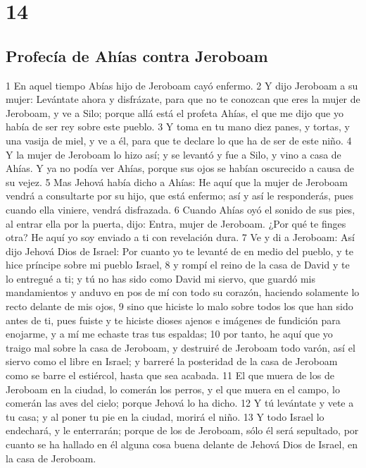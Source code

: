 \chapter{14}

\section*{Profecía de Ahías contra Jeroboam}

1 En aquel tiempo Abías hijo de Jeroboam cayó enfermo.
2 Y dijo Jeroboam a su mujer: Levántate ahora y disfrázate, para que no te conozcan que eres la mujer de Jeroboam, y ve a Silo; porque allá está el profeta Ahías, el que me dijo que yo había de ser rey sobre este pueblo.
3 Y toma en tu mano diez panes, y tortas, y una vasija de miel, y ve a él, para que te declare lo que ha de ser de este niño.
4 Y la mujer de Jeroboam lo hizo así; y se levantó y fue a Silo, y vino a casa de Ahías. Y ya no podía ver Ahías, porque sus ojos se habían oscurecido a causa de su vejez.
5 Mas Jehová había dicho a Ahías: He aquí que la mujer de Jeroboam vendrá a consultarte por su hijo, que está enfermo; así y así le responderás, pues cuando ella viniere, vendrá disfrazada.
6 Cuando Ahías oyó el sonido de sus pies, al entrar ella por la puerta, dijo: Entra, mujer de Jeroboam. ¿Por qué te finges otra? He aquí yo soy enviado a ti con revelación dura.
7 Ve y di a Jeroboam: Así dijo Jehová Dios de Israel: Por cuanto yo te levanté de en medio del pueblo, y te hice príncipe sobre mi pueblo Israel,
8 y rompí el reino de la casa de David y te lo entregué a ti; y tú no has sido como David mi siervo, que guardó mis mandamientos y anduvo en pos de mí con todo su corazón, haciendo solamente lo recto delante de mis ojos,
9 sino que hiciste lo malo sobre todos los que han sido antes de ti, pues fuiste y te hiciste dioses ajenos e imágenes de fundición para enojarme, y a mí me echaste tras tus espaldas;
10 por tanto, he aquí que yo traigo mal sobre la casa de Jeroboam, y destruiré de Jeroboam todo varón, así el siervo como el libre en Israel; y barreré la posteridad de la casa de Jeroboam como se barre el estiércol, hasta que sea acabada. 
11 El que muera de los de Jeroboam en la ciudad, lo comerán los perros, y el que muera en el campo, lo comerán las aves del cielo; porque Jehová lo ha dicho.
12 Y tú levántate y vete a tu casa; y al poner tu pie en la ciudad, morirá el niño.
13 Y todo Israel lo endechará, y le enterrarán; porque de los de Jeroboam, sólo él será sepultado, por cuanto se ha hallado en él alguna cosa buena delante de Jehová Dios de Israel, en la casa de Jeroboam.
